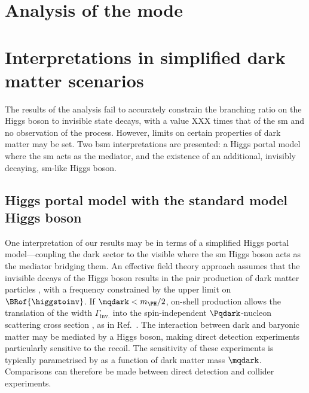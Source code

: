 \section{Analysis of the \texorpdfstring{\ggF}{ggF} mode}
\label{sec:htoinv_analysis_ggF}





\section{Interpretations in simplified dark matter scenarios}
\label{sec:htoinv_dark_matter_models}

The results of the analysis fail to accurately constrain the branching ratio on the Higgs boson to invisible state decays, with a value XXX times that of the \acrlong{sm} and no observation of the process. However, limits on certain properties of dark matter may be set. Two \acrshort{bsm} interpretations are presented: a Higgs portal model where the \acrshort{sm} acts as the mediator, and the existence of an additional, invisibly decaying, \acrshort{sm}-like Higgs boson.




\subsection{Higgs portal model with the standard model Higgs boson}
\label{subsec:htoinv_dark_matter_higgs_portal}

One interpretation of our results may be in terms of a simplified Higgs portal model---coupling the dark sector to the visible where the \acrshort{sm} Higgs boson acts as the mediator bridging them. An effective field theory approach assumes that the invisible decays of the Higgs boson results in the pair production of dark matter particles \Pqdark, with a frequency constrained by the upper limit on $\BRof{\higgstoinv}$. If $\mqdark < m_{\PH}/\text{2}$, on-shell production allows the translation of the \higgstoinv width $\Gamma_{\mathrm{inv.}}$ into the spin-independent $\Pqdark$-nucleon scattering cross section \xsecSI, as in Ref.~. The interaction between dark and baryonic matter may be mediated by a Higgs boson, making direct detection experiments particularly sensitive to the recoil. The sensitivity of these experiments is typically parametrised by \xsecSI as a function of dark matter mass $\mqdark$. Comparisons can therefore be made between direct detection and collider experiments.

